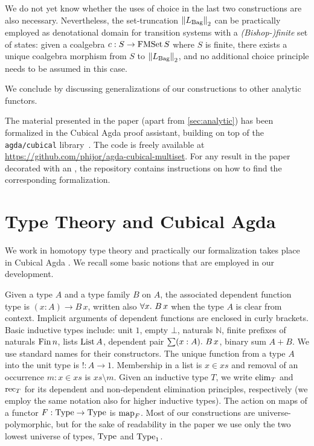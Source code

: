 \documentclass[final,a4paper,USenglish,cleveref]{lipics-v2021}
\begin{document}
We do not yet know whether the uses of choice in the last two constructions are also necessary. Nevertheless, the set-truncation $\SetTrunc{\Lim{\Bag}}$ can be practically employed as denotational domain for transition systems with a \emph{(Bishop-)finite} set of states: given a coalgebra $c : S \to \FMSet S$ where $S$ is finite, there exists a unique coalgebra morphism from $S$ to $\SetTrunc{\Lim{\Bag}}$, and no additional choice principle needs to be assumed in this case. 

We conclude by discussing generalizations of our constructions to other analytic functors.

The material presented in the paper (apart from \cref{sec:analytic}) has been formalized in the Cubical Agda proof assistant,
building on top of the {\texttt{agda/cubical}} library~\cite{AgdaCubical2018}.
The code is freely available at \url{https://github.com/phijor/agda-cubical-multiset}.
For any result in the paper decorated with an ,
the repository contains instructions on how to find the corresponding formalization.

\section{Type Theory and Cubical Agda}

We work in homotopy type theory \cite{HoTTBook} and practically our formalization takes place in Cubical Agda \cite{Vezzosi2019}. We recall some basic notions that are employed in our development.

Given a type $A$ and a type family $B$ on $A$, the associated dependent function type is $(x : A) \to B \, x$, written also $\forall x \mathpunct{.}\, B\,x$ when the type $A$ is clear from context. Implicit arguments of dependent functions are enclosed in curly brackets. Basic inductive types include: unit $1$, empty $\bot$, naturals $ℕ$, finite prefixes of naturals $\Fin n$, lists $\List A$, dependent pair $\sum (x : A) \mathpunct{.}\, B \, x$, binary sum $A + B$. We use standard names for their constructors. The unique function from a type $A$ into the unit type is $! : A \to 1$. Membership in a list is $x \in xs$ and removal of an occurrence $m : x \in xs$ is $xs \setminus m$. Given an inductive type $T$, we write $\Elim{T}$ and $\Rec{T}$ for its dependent and non-dependent elimination  principles, respectively (we employ the same notation also for higher inductive types). The action on maps of a functor $F : \Type \to \Type$ is $\Map{F}$. Most of our constructions are universe-polymorphic, but for the sake of readability in the paper we use only the two lowest universe of types, $\Type$ and $\Type_1$.
\end{document}
